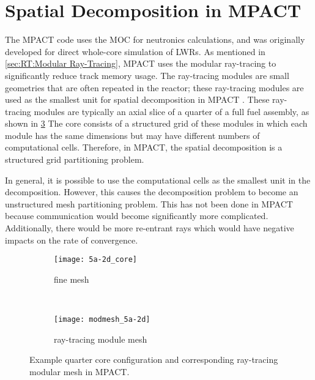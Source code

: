 {  \section{Spatial Decomposition in MPACT}{\label{sec:Spatial Decomposition:Spatial Decomposition in MPACT}
    The MPACT code uses the \ac{MOC} for neutronics calculations, and was originally developed for direct whole-core simulation of \acp{LWR}.
    As mentioned in \cref{sec:RT:Modular Ray-Tracing}, MPACT uses the modular ray-tracing \cite{Saji2000} to significantly reduce track memory usage.
    The ray-tracing modules are small geometries that are often repeated in the reactor; these ray-tracing modules are used as the smallest unit for spatial decomposition in MPACT \cite{StimpsonPartitioning2017}.
    These ray-tracing modules are typically an axial slice of a quarter of a full fuel assembly, as shown in \cref{fig:Spatial Decomposition:5a-2d abstraction}
    The core consists of a structured grid of these modules in which each module has the same dimensions but may have different numbers of computational cells.
    Therefore, in MPACT, the spatial decomposition is a structured grid partitioning problem.

    In general, it is possible to use the computational cells as the smallest unit in the decomposition.
    However, this causes the decomposition problem to become an unstructured mesh partitioning problem.
    This has not been done in MPACT because communication would become significantly more complicated.
    Additionally, there would be more re-entrant rays which would have negative impacts on the rate of convergence.

    \begin{figure}
      \centering
      \begin{subfigure}[t]{0.45\textwidth}
        \centering
        \texttt{[image: 5a-2d\_core]}
        \caption{fine mesh\label{fig:Spatial Decomposition:5a-2d configuration}}
      \end{subfigure}%
      ~
      \begin{subfigure}[t]{0.45\textwidth}
        \centering
        \texttt{[image: modmesh\_5a-2d]}
        \caption{ray-tracing module mesh\label{fig:Spatial Decomposition:5a-2d modular mesh}}
      \end{subfigure}
      \caption{Example quarter core configuration and corresponding ray-tracing modular mesh in MPACT. \label{fig:Spatial Decomposition:5a-2d abstraction}}
    \end{figure}

}}
